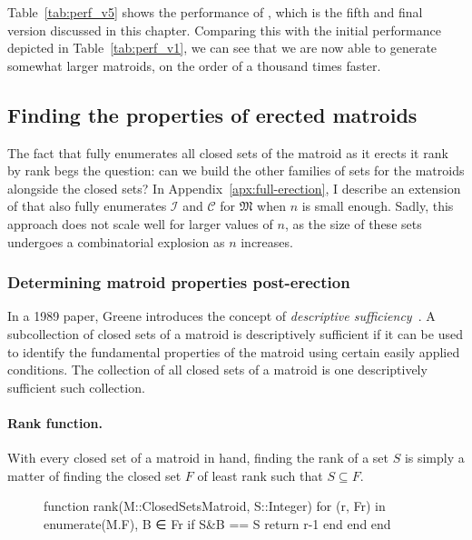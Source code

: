 Table~\ref{tab:perf_v5} shows the performance of , which is the fifth and final version discussed in this chapter. Comparing this with the initial performance depicted in Table~\ref{tab:perf_v1}, we can see that we are now able to generate somewhat larger matroids, on the order of a thousand times faster.

\subsection{Finding the properties of erected matroids}
The fact that  fully enumerates all closed sets of the matroid as it erects it rank by rank begs the question: can we build the other families of sets for the matroids alongside the closed sets? In Appendix~\ref{apx:full-erection}, I describe an extension of  that also fully enumerates $\mathcal{I}$ and $\mathcal{C}$ for $\mathfrak{M}$ when $n$ is small enough. Sadly, this approach does not scale well for larger values of $n$, as the size of these sets undergoes a combinatorial explosion as $n$ increases. 


\subsubsection{Determining matroid properties post-erection}
In a 1989 paper, Greene introduces the concept of \textit{descriptive sufficiency}~\cite{greene-1991}. A subcollection of closed sets of a matroid is descriptively sufficient if it can be used to identify the fundamental properties of the matroid using certain easily applied conditions. The collection of all closed sets of a matroid is one descriptively sufficient such collection. 

\paragraph{Rank function.} With every closed set of a matroid in hand, finding the rank of a set $S$ is simply a matter of finding the closed set $F$ of least rank such that $S\subseteq F$.

\begin{figure}
\begin{jllisting}
function rank(M::ClosedSetsMatroid, S::Integer)
  for (r, Fr) in enumerate(M.F), B ∈ Fr
      if S&B == S return r-1 end
  end
end
\end{jllisting}
\end{figure}

